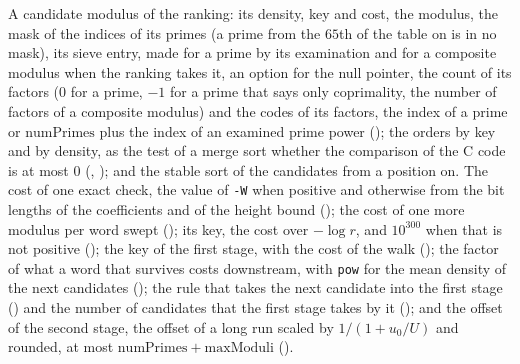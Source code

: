 \begin{definition}\label{def:costModel}
  \leanok
  A candidate modulus of the ranking: its density, key and cost, the modulus, the mask of the
  indices of its primes (a prime from the $65$th of the table on is in no mask), its sieve entry,
  made for a prime by its examination and for a composite modulus when the ranking takes it, an
  option for the null pointer, the count of its factors ($0$ for a prime, $-1$ for a prime that says
  only coprimality, the number of factors of a composite modulus) and the codes of its factors, the
  index of a prime or $\mathrm{numPrimes}$ plus the index of an examined prime power
  (); the orders by key and by density, as the test of a merge sort
  whether the comparison of the C code is at most $0$ (,
  ); and the stable sort of the candidates from a position on.
  The cost of one exact check, the value of \verb|-W| when positive and otherwise from the bit
  lengths of the coefficients and of the height bound (); the
  cost of one more modulus per word swept (); its key, the cost
  over $-\log r$, and $10^{300}$ when that is not positive ();
  the key of the first stage, with the cost of the walk (); the
  factor of what a word that survives costs downstream, with \verb|pow| for the mean density of the
  next candidates (); the rule that takes the next candidate into
  the first stage () and the number of candidates that the first
  stage takes by it (); and the offset of the second stage, the
  offset of a long run scaled by $1/(1 + u_0/U)$ and rounded, at most
  $\mathrm{numPrimes} + \mathrm{maxModuli}$ ().
\end{definition}

